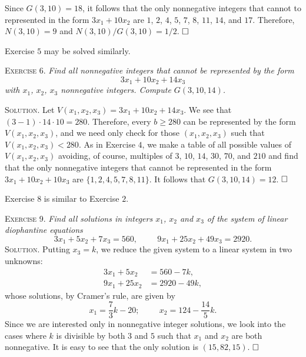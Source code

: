 \documentclass[11pt, leqno]{article}
\newcommand{\done}{\ensuremath{\hfill\square}}
\begin{document}
Since $G(3,10)=18$, it follows that the only nonnegative integers that cannot to represented in the form $3x_1 + 10x_2$ are $1$, $2$, $4$, $5$, $7$, $8$, $11$, $14$, and $17$. Therefore, $N(3,10) = 9$ and $N(3,10)/G(3,10) = 1/2$. \done

Exercise $5$ may be solved similarly.

\textsc{Exercise 6}. \emph{Find all nonnegative integers that cannot be represented by the form 
\begin{displaymath}
3x_1 + 10x_2 + 14x_3
\end{displaymath}
with $x_1$, $x_2$, $x_3$ nonnegative integers. Compute $G(3,10,14)$.}

\textsc{Solution}. Let $V(x_1, x_2, x_3) = 3x_1 + 10x_2 + 14x_3$. We see that $(3-1)\cdot 14 \cdot 10 = 280$. Therefore, every $b\geq 280$ can be represented by the form $V(x_1, x_2, x_3)$, and we need only check for those $(x_1, x_2, x_3)$ such that $V(x_1, x_2, x_3) < 280$. As in Exercise $4$, we make a table of all possible values of $V(x_1, x_2, x_3)$ avoiding, of course, multiples of $3$, $10$, $14$, $30$, $70$, and $210$ and find that the only nonnegative integers that cannot be represented in the form $3x_1 + 10x_2 + 10x_3$ are $\{ 1, 2, 4, 5, 7, 8, 11 \}$. It follows that $G(3,10,14) = 12$. \done

Exercise $8$ is similar to Exercise $2$.

\textsc{Exercise 9}. \emph{Find all solutions in integers $x_1$, $x_2$ and $x_3$ of the system of linear diophantine equations 
\begin{displaymath}
  3x_1 + 5x_2 + 7x_3 = 560, \hspace{1cm}
  9x_1 + 25x_2 + 49x_3 = 2920.
\end{displaymath}}\textsc{Solution}. Putting $x_3 = k$, we reduce the given system to a linear system in two unknowns: 
\begin{align*}
  3x_1 + 5x_2 &= 560 - 7k, \\
  9x_1 + 25x_2 &= 2920 - 49k,
\end{align*}
whose solutions, by Cramer's rule, are given by 
\begin{displaymath}
x_1 = \frac{7}{3}k - 20; \hspace{1cm} x_2 = 124 - \frac{14}{5}k.
\end{displaymath}
Since we are interested only in nonnegative integer solutions, we look into the cases where $k$ is divisible by both $3$ and $5$ such that $x_1$ and $x_2$ are both nonnegative. It is easy to see that the only solution is $(15, 82, 15)$. \done
\end{document}
